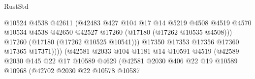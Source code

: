 \begin{lexlean}{RustStd}
\begin{coremodule}
                                              @10524
                                              @4538
                                              @42611
                                              (@42483
                                                @427
                                                @104
                                                @17
                                                @14
                                                @5219
                                                @4508
                                                @4519
                                                @4570
                                                @10534
                                                @4538
                                                @42650
                                                @42527
                                                @17260
                                                (@17180 (@17262 @10535 @4508)))
                                              @17260
                                              (@17180 (@17262 @10525 @10541)))
                                            @17350
                                            @17353
                                            @17356
                                            @17360
                                            @17365
                                            @17371))))
                                    (@42581
                                      @2033
                                      @104
                                      @1181
                                      @14
                                      @10591
                                      @4519
                                      (@42589
                                        @2030
                                        @145
                                        @22
                                        @17
                                        @10589
                                        @4629
                                        (@42581
                                          @2030
                                          @406
                                          @22
                                          @19
                                          @10589
                                          @10968
                                          (@42702
                                            @2030
                                            @22
                                            @10578
                                            @10587

\end{coremodule}
\end{lexlean}

